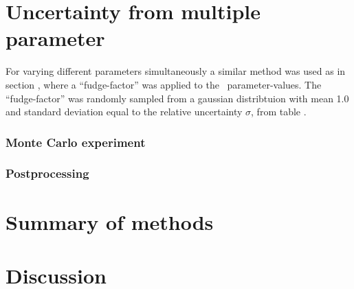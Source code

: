 \section{Uncertainty from multiple parameter}
For varying different parameters simultaneously a similar method was used as in section , where a ``fudge-factor'' was applied to the \fiduccialomega\ parameter-values. The ``fudge-factor'' was randomly sampled from a gaussian distribtuion with mean 1.0 and standard deviation equal to the relative uncertainty $\sigma$, from table .


\subsubsection{Monte Carlo experiment}

\subsubsection{Postprocessing}

\FloatBarrier

\section{Summary of methods}
\section{Discussion}


